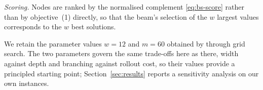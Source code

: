 \emph{Scoring.} Nodes are ranked by the normalised complement
\eqref{eq:bs-score} rather than by objective~(1) directly, so that the beam's
selection of the $w$ largest values corresponds to the $w$ best solutions.

We retain the parameter values $w = 12$ and $m = 60$ obtained by
\citet{xu2026} through grid search. The two parameters govern the same
trade-offs here as there, width against depth and branching against rollout
cost, so their values provide a principled starting point; Section~\ref{sec:results}
reports a sensitivity analysis on our own instances.
